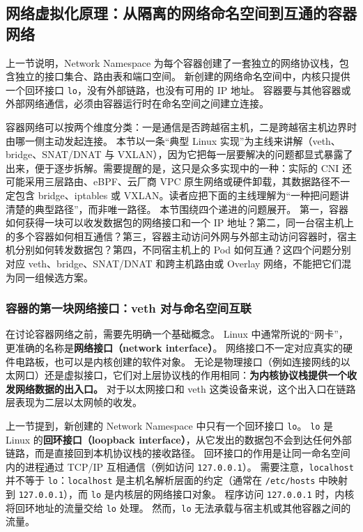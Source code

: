 \subsection{网络虚拟化原理：从隔离的网络命名空间到互通的容器网络}
\label{sec6:network-virtualization}

上一节说明，Network Namespace 为每个容器创建了一套独立的网络协议栈，包含独立的接口集合、路由表和端口空间。
新创建的网络命名空间中，内核只提供一个回环接口 \texttt{lo}，没有外部链路，也没有可用的 IP 地址。
容器要与其他容器或外部网络通信，必须由容器运行时在命名空间之间建立连接。

容器网络可以按两个维度分类：一是通信是否跨越宿主机，二是跨越宿主机边界时由哪一侧主动发起连接。
本节以一条“典型 Linux 实现”为主线来讲解（veth、bridge、SNAT/DNAT 与 VXLAN），因为它把每一层要解决的问题都显式暴露了出来，便于逐步拆解。需要提醒的是，这只是众多实现中的一种：实际的 CNI 还可能采用三层路由、eBPF、云厂商 VPC 原生网络或硬件卸载，其数据路径不一定包含 bridge、iptables 或 VXLAN。读者应把下面的主线理解为“一种把问题讲清楚的典型路径”，而非唯一路径。
本节围绕四个递进的问题展开。
第一，容器如何获得一块可以收发数据包的网络接口和一个 IP 地址？第二，同一台宿主机上的多个容器如何相互通信？第三，容器主动访问外网与外部主动访问容器时，宿主机分别如何转发数据包？第四，不同宿主机上的 Pod 如何互通？这四个问题分别对应 veth、bridge、SNAT/DNAT 和跨主机路由或 Overlay 网络，不能把它们混为同一组候选方案。

\subsubsection{容器的第一块网络接口：veth 对与命名空间互联}

在讨论容器网络之前，需要先明确一个基础概念。
Linux 中通常所说的“网卡”，更准确的名称是\textbf{网络接口（network interface）}。
网络接口不一定对应真实的硬件电路板，也可以是内核创建的软件对象。
无论是物理接口（例如连接网线的以太网口）还是虚拟接口，它们对上层协议栈的作用相同：\textbf{为内核协议栈提供一个收发网络数据的出入口。}
对于以太网接口和 veth 这类设备来说，这个出入口在链路层表现为二层以太网帧的收发。

上一节提到，新创建的 Network Namespace 中只有一个回环接口 \texttt{lo}。
\texttt{lo} 是 Linux 的\textbf{回环接口（loopback interface）}，从它发出的数据包不会到达任何外部链路，而是直接回到本机协议栈的接收路径。
回环接口的作用是让同一命名空间内的进程通过 TCP/IP 互相通信（例如访问 \texttt{127.0.0.1}）。
需要注意，\texttt{localhost} 并不等于 \texttt{lo}：\texttt{localhost} 是主机名解析层面的约定（通常在 \texttt{/etc/hosts} 中映射到 \texttt{127.0.0.1}），而 \texttt{lo} 是内核层的网络接口对象。
程序访问 \texttt{127.0.0.1} 时，内核将回环地址的流量交给 \texttt{lo} 处理。
然而，\texttt{lo} 无法承载与宿主机或其他容器之间的流量。

